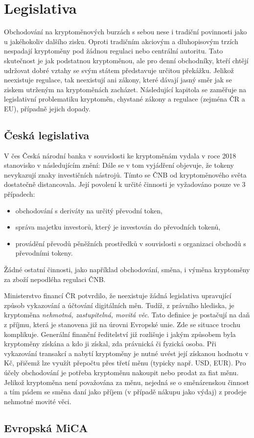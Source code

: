 \chapter{Legislativa}
\label{sec:Legislation}
Obchodování na kryptoměnových burzách s sebou nese i tradiční povinnosti jako u jakéhokoliv dalšího zisku. Oproti tradičním akciovým a dluhopisovým trzích nespadají kryptoměny pod žádnou
regulaci nebo centrální autoritu. Tato skutečnost je jak podstatnou kryptoměnou, ale pro denní obchodníky, kteří chtějí udržovat dobré vztahy se svým státem představuje určitou překážku.
Jelikož neexistuje regulace, tak neexistují ani zákony, které dávají jasný směr jak se ziskem utrženým na kryptoměnách zacházet. Následující kapitola se zaměřuje na legislativní problematiku
kryptoměn, chystané zákony a regulace (zejména ČR a EU), případně jejich dopady.


\section*{Česká legislativa}
V čes
Česká národní banka v souvislosti ke kryptoměnám vydala v roce 2018 stanovisko v následujícím znění:  %
Dále se v tom vyjádření objevuje, že tokeny nevykazují znaky investičních nástrojů. Tímto se ČNB od kryptoměnového světa dostatečně distancovala. Její povolení k určité činnosti
je vyžadováno pouze ve 3 případech:
\begin{itemize}
    \item obchodování s deriváty na určitý převodní token,
    \item správa majetku investorů, který je investován do převodních tokenů,
    \item provádění převodů pěněžních prostředků v souvislosti s organizaci obchodů s převodními tokeny.
\end{itemize}
Žádné ostatní činnosti, jako například obchodování, směna, i výměna kryptoměny za zboží nepodléha regulaci ČNB.

Ministerstvo financí ČR potvrdilo, že neexistuje žádná legislativa upravující způsob vykazování a účtování digitálních měn. %
Tudíž, z právního hlediska, je kryptoměna \emph{nehmotná, zastupitelná, movitá věc}. Tato definice je postačují na daň z příjmu, která je stanovena již na úrovni Evropské unie.
Zde se situace trochu komplikuje. Generální finanční ředitelství již rozlišuje i jakým způsobem byla kryptoměny získána a kdo ji získal, zda právnická či fyzická osoba.
Při vykazování transakcí a nabytí kryptoměny je nutné uvést její získanou hodnotu v Kč, přičemž lze využít přepočtu přes třetí měnu (typicky např. USD, EUR).
Pro účely obchodování je potřeba kryptoměnu nakoupit nebo prodat za fiat měnu. Jelikož kryptoměna není považována za měnu, nejedná se o směnárenskou činnost a tím pádem
se směna daní jako příjem (v případě nákupu jako výdaj) z prodeje nehmotné movité věci.

\section*{Evropská MiCA}


\endinput 
